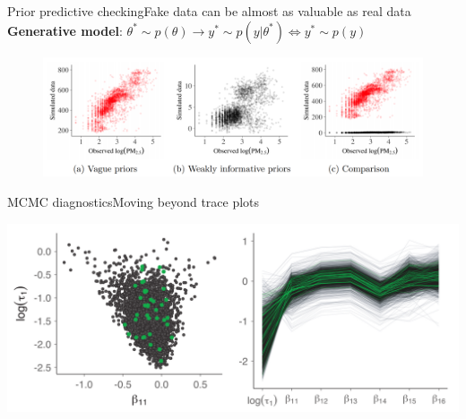 \documentclass{beamer}
\begin{document}
	\begin{frame}{Prior predictive checking}{Fake data can be almost as valuable as real data}
		\textbf{Generative model}:	$ \theta^* \sim p(\theta) \longrightarrow y^* \sim p(y|\theta^*) \Longleftrightarrow  y^* \sim p(y)$
		
		\begin{figure}
			\includegraphics[scale=0.3]{images/fake_data.png}
		\end{figure}
			
		
		
	\end{frame}

	\begin{frame}{MCMC diagnostics}{Moving beyond trace plots}
		
			\includegraphics[scale=0.23]{images/scatterplot.png}
		
	\end{frame}
	
\end{document}
